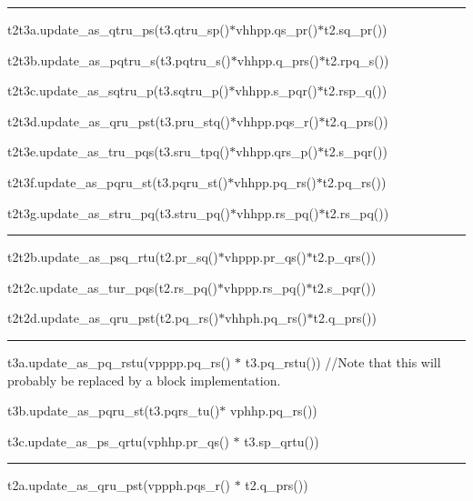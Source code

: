\documentclass[letterpaper,10pt,english]{/Users/kinealicegulbrandsen/anaconda/lib/python2.7/site-packages/sphinx/texinputs/sphinxhowto}
\begin{document}
\begin{center}\rule{0.5\linewidth}{\linethickness}\end{center}

t2t3a.update\_as\_qtru\_ps(t3.qtru\_sp()\(*\)vhhpp.qs\_pr()\(*\)t2.sq\_pr())

t2t3b.update\_as\_pqtru\_s(t3.pqtru\_s()\(*\)vhhpp.q\_prs()\(*\)t2.rpq\_s())

t2t3c.update\_as\_sqtru\_p(t3.sqtru\_p()\(*\)vhhpp.s\_pqr()\(*\)t2.rsp\_q())

t2t3d.update\_as\_qru\_pst(t3.pru\_stq()\(*\)vhhpp.pqs\_r()\(*\)t2.q\_prs())

t2t3e.update\_as\_tru\_pqs(t3.sru\_tpq()\(*\)vhhpp.qrs\_p()\(*\)t2.s\_pqr())

t2t3f.update\_as\_pqru\_st(t3.pqru\_st()\(*\)vhhpp.pq\_rs()\(*\)t2.pq\_rs())

t2t3g.update\_as\_stru\_pq(t3.stru\_pq()\(*\)vhhpp.rs\_pq()\(*\)t2.rs\_pq())

\begin{center}\rule{0.5\linewidth}{\linethickness}\end{center}

t2t2b.update\_as\_psq\_rtu(t2.pr\_sq()\(*\)vhppp.pr\_qs()\(*\)t2.p\_qrs())

t2t2c.update\_as\_tur\_pqs(t2.rs\_pq()\(*\)vhppp.rs\_pq()\(*\)t2.s\_pqr())

t2t2d.update\_as\_qru\_pst(t2.pq\_rs()\(*\)vhhph.pq\_rs()\(*\)t2.q\_prs())

\begin{center}\rule{0.5\linewidth}{\linethickness}\end{center}

t3a.update\_as\_pq\_rstu(vpppp.pq\_rs() \(*\) t3.pq\_rstu()) //Note that
this will probably be replaced by a block implementation.

t3b.update\_as\_pqru\_st(t3.pqrs\_tu()\(*\) vphhp.pq\_rs())

t3c.update\_as\_ps\_qrtu(vphhp.pr\_qs() \(*\) t3.sp\_qrtu())

\begin{center}\rule{0.5\linewidth}{\linethickness}\end{center}

t2a.update\_as\_qru\_pst(vppph.pqs\_r() \(*\) t2.q\_prs())
\end{document}
